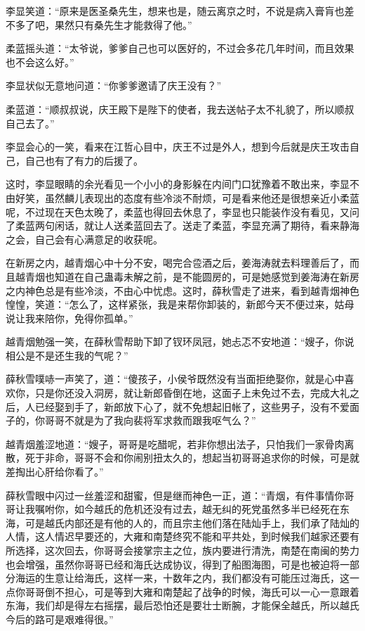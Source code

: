 李显笑道：“原来是医圣桑先生，想来也是，随云离京之时，不说是病入膏肓也差不多了吧，果然只有桑先生才能救得了他。”

柔蓝摇头道：“太爷说，爹爹自己也可以医好的，不过会多花几年时间，而且效果也不会这么好。”

李显状似无意地问道：“你爹爹邀请了庆王没有？”

柔蓝道：“顺叔叔说，庆王殿下是陛下的使者，我去送帖子太不礼貌了，所以顺叔自己去了。”

李显会心的一笑，看来在江哲心目中，庆王不过是外人，想到今后就是庆王攻击自己，自己也有了有力的后援了。

这时，李显眼睛的余光看见一个小小的身影躲在内间门口犹豫着不敢出来，李显不由好笑，虽然麟儿表现出的态度有些冷淡不耐烦，可是看来他还是很想亲近小柔蓝呢，不过现在天色太晚了，柔蓝也得回去休息了，李显也只能装作没有看见，又问了柔蓝两句闲话，就让人送柔蓝回去了。送走了柔蓝，李显充满了期待，看来静海之会，自己会有心满意足的收获呢。

在新房之内，越青烟心中十分不安，喝完合卺酒之后，姜海涛就去料理善后了，而且越青烟也知道在自己蛊毒未解之前，是不能圆房的，可是她感觉到姜海涛在新房之内神色总是有些冷淡，不由心中忧虑。这时，薛秋雪走了进来，看到越青烟神色惶惶，笑道：“怎么了，这样紧张，我是来帮你卸装的，新郎今天不便过来，姑母说让我来陪你，免得你孤单。”

越青烟勉强一笑，在薛秋雪帮助下卸了钗环凤冠，她忐忑不安地道：“嫂子，你说相公是不是还生我的气呢？”

薛秋雪噗哧一声笑了，道：“傻孩子，小侯爷既然没有当面拒绝娶你，就是心中喜欢你，只是你还没入洞房，就让新郎昏倒在地，这面子上未免过不去，完成大礼之后，人已经娶到手了，新郎放下心了，就不免想起旧帐了，这些男子，没有不爱面子的，你哥哥不就是为了我向裴将军求救而跟我呕气么？”

越青烟羞涩地道：“嫂子，哥哥是吃醋呢，若非你想出法子，只怕我们一家骨肉离散，死于非命，哥哥不会和你闹别扭太久的，想起当初哥哥追求你的时候，可是就差掏出心肝给你看了。”

薛秋雪眼中闪过一丝羞涩和甜蜜，但是继而神色一正，道：“青烟，有件事情你哥哥让我嘱咐你，如今越氏的危机还没有过去，越无纠的死党虽然多半已经死在东海，可是越氏内部还是有他的人的，而且宗主他们落在陆灿手上，我们承了陆灿的人情，这人情迟早要还的，大雍和南楚终究不能和平共处，到时候我们越家还要有所选择，这次回去，你哥哥会接掌宗主之位，族内要进行清洗，南楚在南闽的势力也会增强，虽然你哥哥已经和海氏达成协议，得到了船图海图，可是也被迫将一部分海运的生意让给海氏，这样一来，十数年之内，我们都没有可能压过海氏，这一点你哥哥倒不担心，可是等到大雍和南楚起了战争的时候，海氏可以一心一意跟着东海，我们却是得左右摇摆，最后恐怕还是要壮士断腕，才能保全越氏，所以越氏今后的路可是艰难得很。”

